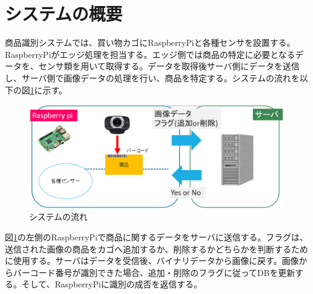 \section{システムの概要}
商品識別システムでは、買い物カゴにRaspberryPiと各種センサを設置する。RaspberryPiがエッジ処理を担当する。エッジ側では商品の特定に必要となるデータを、センサ類を用いて取得する。データを取得後サーバ側にデータを送信し、サーバ側で画像データの処理を行い、商品を特定する。システムの流れを以下の図\ref{system_summary}に示す。

\begin{figure}[htbp]
\centering
\includegraphics[width=12cm]{./pic/summary.eps}
\caption{システムの流れ}
\label{system_summary}
\end{figure}


図\ref{system_summary}の左側のRaspberryPiで商品に関するデータをサーバに送信する。フラグは、送信された画像の商品をカゴへ追加するか、削除するかどちらかを判断するために使用する。サーバはデータを受信後、バイナリデータから画像に戻す。画像からバーコード番号が識別できた場合、追加・削除のフラグに従ってDBを更新する。そして、RaspberryPiに識別の成否を返信する。

